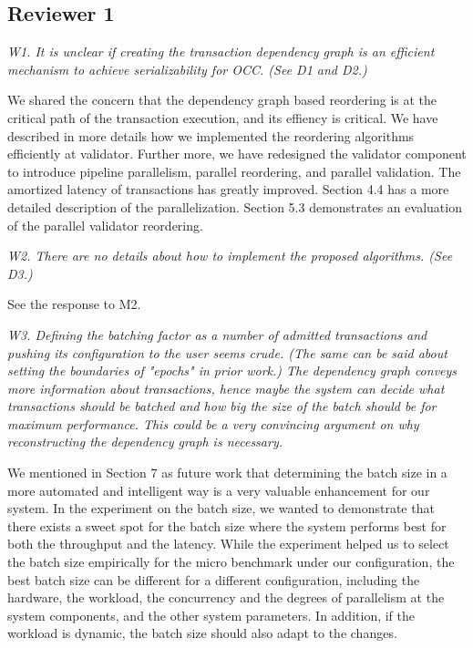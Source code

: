 \documentclass{article}
\begin{document}
\subsection{Reviewer 1}

\emph{W1. It is unclear if creating the transaction dependency graph is an efficient mechanism to achieve serializability for OCC. (See D1 and D2.)}

We shared the concern that the dependency graph based reordering is at the critical path of the transaction execution, and its effiency is critical. We have described in more details how we implemented the reordering algorithms efficiently at validator. Further more, we have redesigned the validator component to introduce pipeline parallelism, parallel reordering, and parallel validation. The amortized latency of transactions has greatly improved. Section 4.4 has a more detailed description of the parallelization. Section 5.3 demonstrates an evaluation of the parallel validator reordering.

\emph{W2. There are no details about how to implement the proposed algorithms. (See D3.)}

See the response to M2.

\emph{W3. Defining the batching factor as a number of admitted transactions and pushing its configuration to the user seems crude. (The same can be said about setting the boundaries of "epochs" in prior work.) The dependency graph conveys more information about transactions, hence maybe the system can decide what transactions should be batched and how big the size of the batch should be for maximum performance. This could be a very convincing argument on why reconstructing the dependency graph is necessary.}

We mentioned in Section 7 as future work that determining the batch size in a more automated and intelligent way is a very valuable enhancement for our system. In the experiment on the batch size, we wanted to demonstrate that there exists a sweet spot for the batch size where the system performs best for both the throughput and the latency. While the experiment helped us to select the batch size empirically for the micro benchmark under our configuration, the best batch size can be different for a different configuration, including the hardware, the workload, the concurrency and the degrees of parallelism at the system components, and the other system parameters. In addition, if the workload is dynamic, the batch size should also adapt to the changes.
\end{document}
